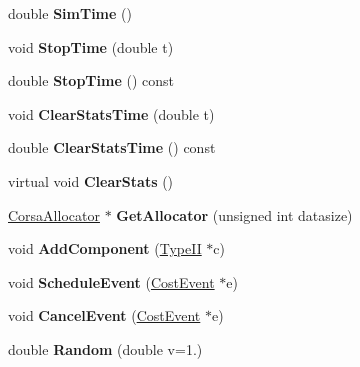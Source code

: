 \begin{DoxyCompactItemize}
\mbox{\label{classCostSimEng_a874b89eda70f909bd008b9fb4b8847ea}} 
double {\bfseries Sim\+Time} ()
\item 
\mbox{\label{classCostSimEng_a942ec6fc1324614d65f8e18231230990}} 
void {\bfseries Stop\+Time} (double t)
\item 
\mbox{\label{classCostSimEng_a79440b2e2468c8996e24b4a60099d33b}} 
double {\bfseries Stop\+Time} () const
\item 
\mbox{\label{classCostSimEng_a80691746a7c7edb5d12de3d879e3266c}} 
void {\bfseries Clear\+Stats\+Time} (double t)
\item 
\mbox{\label{classCostSimEng_a58be6ebd56f080abf5607c09f99a0f30}} 
double {\bfseries Clear\+Stats\+Time} () const
\item 
\mbox{\label{classCostSimEng_a431e85fcd9c3b40aa8cfc53c01afb6ae}} 
virtual void {\bfseries Clear\+Stats} ()
\item 
\mbox{\label{classCostSimEng_a6d42fb3dbbc7df03c8459a35ecfee169}} 
\hyperlink{classCorsaAllocator}{Corsa\+Allocator} $\ast$ {\bfseries Get\+Allocator} (unsigned int datasize)
\item 
\mbox{\label{classCostSimEng_ac288e315c9b81c4df432980ff44bd866}} 
void {\bfseries Add\+Component} (\hyperlink{classTypeII}{Type\+II} $\ast$c)
\item 
\mbox{\label{classCostSimEng_a38c4aabf44e65ddfdd959729ebcb4dcf}} 
void {\bfseries Schedule\+Event} (\hyperlink{structCostEvent}{Cost\+Event} $\ast$e)
\item 
\mbox{\label{classCostSimEng_a455377f81802c06e04e4dc391791b56e}} 
void {\bfseries Cancel\+Event} (\hyperlink{structCostEvent}{Cost\+Event} $\ast$e)
\item 
\mbox{\label{classCostSimEng_a6048a0a1cff49a4e2f7bfeca381e6723}} 
double {\bfseries Random} (double v=1.)
\item 
\mbox{\label{classCostSimEng_a127601c325d19488fdf0c581b768f7f2}} 

\end{DoxyCompactItemize}
